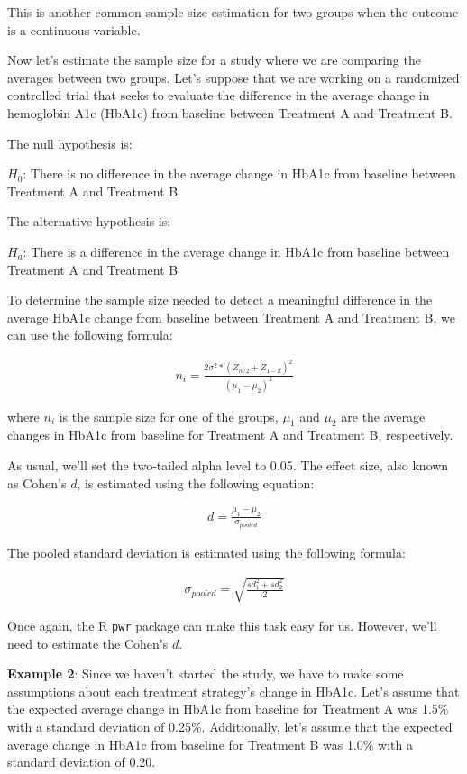 \documentclass[
]{book}
\begin{document}
This is another common sample size estimation for two groups when the outcome is a continuous variable.

Now let's estimate the sample size for a study where we are comparing the averages between two groups. Let's suppose that we are working on a randomized controlled trial that seeks to evaluate the difference in the average change in hemoglobin A1c (HbA1c) from baseline between Treatment A and Treatment B.

\hfill\break

The null hypothesis is:

\(H_{0}\): There is no difference in the average change in HbA1c from baseline between Treatment A and Treatment B

The alternative hypothesis is:

\(H_{a}\): There is a difference in the average change in HbA1c from baseline between Treatment A and Treatment B

To determine the sample size needed to detect a meaningful difference in the average HbA1c change from baseline between Treatment A and Treatment B, we can use the following formula:

\[
\begin{aligned}
n_{i} = \frac{2 \sigma^2 * (Z_{\alpha/2} + Z_{1 - \beta})^2}{({\mu_{1} - \mu_{2}})^2}
\end{aligned}
\]

where \(n_{i}\) is the sample size for one of the groups, \(\mu_{1}\) and \(\mu_{2}\) are the average changes in HbA1c from baseline for Treatment A and Treatment B, respectively.

As usual, we'll set the two-tailed alpha level to 0.05. The effect size, also known as Cohen's \(d\), is estimated using the following equation:

\[
\begin{aligned}
d = \frac{\mu_{1} - \mu_{2}}{\sigma_{pooled}}
\end{aligned}
\]

The pooled standard deviation is estimated using the following formula:

\[
\begin{aligned}
\sigma_{pooled} = \sqrt{\frac{sd_{1}^2 + sd_{2}^2}{2}}
\end{aligned}
\]

Once again, the R \texttt{pwr} package can make this task easy for us. However, we'll need to estimate the Cohen's \(d\).

\textbf{Example 2}: Since we haven't started the study, we have to make some assumptions about each treatment strategy's change in HbA1c. Let's assume that the expected average change in HbA1c from baseline for Treatment A was 1.5\% with a standard deviation of 0.25\%. Additionally, let's assume that the expected average change in HbA1c from baseline for Treatment B was 1.0\% with a standard deviation of 0.20.
\end{document}

